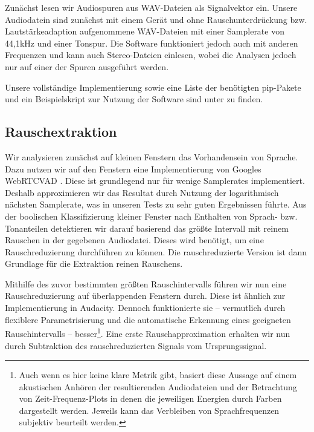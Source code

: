 \documentclass[
	fontsize=10.5pt,
	marginpar=false,
	ngerman,
	accentcolor=3d
	]{tudapub}
\begin{document}
Zunächst lesen wir Audiospuren aus WAV-Dateien als Signalvektor ein. Unsere Audiodatein sind zunächst mit einem Gerät und ohne Rauschunterdrückung bzw. Lautstärkeadaption aufgenommene WAV-Dateien mit einer Samplerate von 44,1kHz und einer Tonspur. Die Software funktioniert jedoch auch mit anderen Frequenzen und kann auch Stereo-Dateien einlesen, wobei die Analysen jedoch nur auf einer der Spuren ausgeführt werden.

Unsere vollständige Implementierung sowie eine Liste der benötigten pip-Pakete und ein Beispielskript zur Nutzung der Software sind unter \cite{blumer_polltip4fm_2020} zu finden. %

\subsection{Rauschextraktion}
\label{noiseremove}

Wir analysieren zunächst auf kleinen Fenstern das Vorhandensein von Sprache. Dazu nutzen wir auf den Fenstern eine Implementierung von Googles WebRTCVAD \cite{wiseman_webrtcvad_nodate}. Diese ist grundlegend nur für wenige Samplerates implementiert. Deshalb approximieren wir das Resultat durch Nutzung der logarithmisch nächsten Samplerate, was in unseren Tests zu sehr guten Ergebnissen führte. Aus der boolischen Klassifizierung kleiner Fenster nach Enthalten von Sprach- bzw. Tonanteilen detektieren wir darauf basierend das größte Intervall mit reinem Rauschen in der gegebenen Audiodatei. Dieses wird benötigt, um eine Rauschreduzierung durchführen zu können. Die rauschreduzierte Version ist dann Grundlage für die Extraktion reinen Rauschens.

Mithilfe des zuvor bestimmten größten Rauschintervalls führen wir nun eine Rauschreduzierung auf überlappenden Fenstern durch. Diese ist ähnlich zur Implementierung in Audacity. Dennoch funktionierte sie – vermutlich durch flexiblere Parametrisierung und die automatische Erkennung eines geeigneten Rauschintervalls – besser\footnote{Auch wenn es hier keine klare Metrik gibt, basiert diese Aussage auf einem akustischen Anhören der resultierenden Audiodateien und der Betrachtung von Zeit-Frequenz-Plots in denen die jeweiligen Energien durch Farben dargestellt werden. Jeweils kann das Verbleiben von Sprachfrequenzen subjektiv beurteilt werden.}. Eine erste Rauschapproximation erhalten wir nun durch Subtraktion des rauschreduzierten Signals vom Ursprungssignal.
\end{document}
